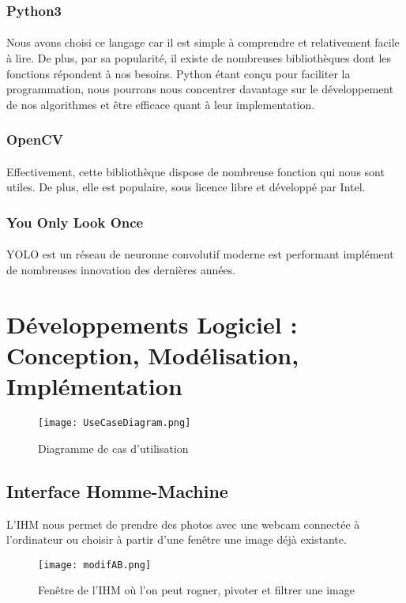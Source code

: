 \documentclass[a4paper]{article}
\begin{document}
			\subsubsection*{Python3}
				\paragraph{} Nous avons choisi ce langage car il est simple à comprendre et relativement facile à lire. De plus, par sa popularité, il existe de nombreuses bibliothèques dont les fonctions répondent à nos besoins. Python étant conçu pour faciliter la programmation, nous pourrons nous concentrer davantage sur le développement de nos algorithmes et être efficace quant à leur implementation.
			\subsubsection*{OpenCV}
				\paragraph{} Effectivement, cette bibliothèque dispose de nombreuse fonction qui nous sont utiles. De plus, elle est populaire, sous licence libre et développé par Intel.
			\subsubsection*{You Only Look Once}
				\paragraph{} YOLO est un réseau de neuronne convolutif moderne est performant implément de nombreuses innovation des dernières années.

	\newpage
	\section{Développements Logiciel : Conception, Modélisation, Implémentation}
		\begin{figure}[h]
			\centering
			\texttt{[image: UseCaseDiagram.png]}
			\caption{Diagramme de cas d'utilisation}
			\label{fig:useCaseDiagram}
		\end{figure}


		\subsection{Interface Homme-Machine}
			L'IHM nous permet de prendre des photos avec une webcam connectée à l'ordinateur ou choisir à partir d'une fenêtre une image déjà existante. 
			\begin{figure}[H]
				\centering
				\texttt{[image: modifAB.png]}
				\caption{Fenêtre de l'IHM où l'on peut rogner, pivoter et filtrer une image}
				\label{fig:modif}
			\end{figure}
\end{document}
